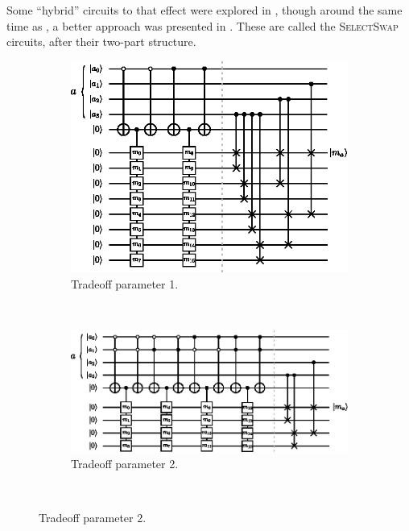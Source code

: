\documentclass[a4paper,12pt]{article}
\begin{document}
Some ``hybrid'' circuits to that effect were explored in \cite{DiMatteo2018, DiMatteo2020}, though around the same time as \cite{DiMatteo2018}, a better approach was presented in \cite{Vadym2018}. These are called the \textsc{SelectSwap} circuits, after their two-part structure.



\begin{figure}
\centering
\begin{subfigure}{0.6\textwidth}
 \centering
 \includegraphics[scale=1.3]{images/select-swap-lambda-1}
 \caption{Tradeoff parameter 1.}
 \end{subfigure} \\ \vspace{0.5cm}
\begin{subfigure}[ht!]{0.8\textwidth}
 \centering
 \includegraphics[scale=1.3]{images/select-swap-lambda-2}
 \caption{Tradeoff parameter 2.}
 \end{subfigure} \\ \vspace{0.5cm}

\end{figure}
\end{document}
